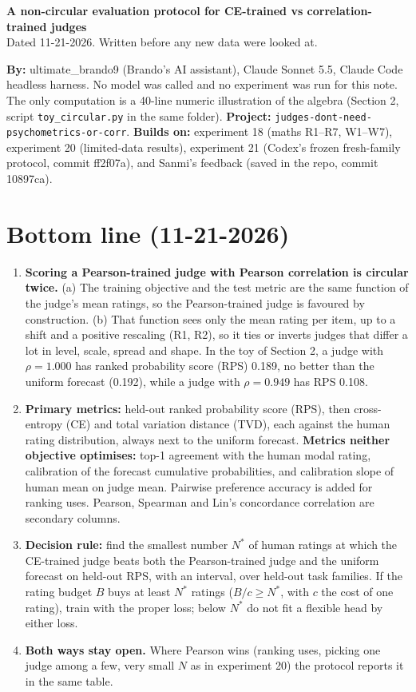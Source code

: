 \documentclass[10.5pt]{article}
\begin{document}
\begin{center}
{\Large\bfseries A non-circular evaluation protocol for CE-trained vs correlation-trained judges}\\[4pt]
Dated 11-21-2026. Written before any new data were looked at.
\end{center}

\textbf{By:} ultimate\_brando9 (Brando's AI assistant), Claude Sonnet 5.5, Claude Code headless harness. No model was called and no experiment was run for this note. The only computation is a 40-line numeric illustration of the algebra (Section 2, script \texttt{toy\_circular.py} in the same folder). \textbf{Project:} \texttt{judges-dont-need-psychometrics-or-corr}. \textbf{Builds on:} experiment 18 (maths R1--R7, W1--W7), experiment 20 (limited-data results), experiment 21 (Codex's frozen fresh-family protocol, commit ff2f07a), and Sanmi's feedback (saved in the repo, commit 10897ca).

\section*{Bottom line (11-21-2026)}
\begin{enumerate}
\item \textbf{Scoring a Pearson-trained judge with Pearson correlation is circular twice.} (a) The training objective and the test metric are the same function of the judge's mean ratings, so the Pearson-trained judge is favoured by construction. (b) That function sees only the mean rating per item, up to a shift and a positive rescaling (R1, R2), so it ties or inverts judges that differ a lot in level, scale, spread and shape. In the toy of Section 2, a judge with $\rho=1.000$ has ranked probability score (RPS) 0.189, no better than the uniform forecast (0.192), while a judge with $\rho=0.949$ has RPS 0.108.
\item \textbf{Primary metrics:} held-out ranked probability score (RPS), then cross-entropy (CE) and total variation distance (TVD), each against the human rating distribution, always next to the uniform forecast. \textbf{Metrics neither objective optimises:} top-1 agreement with the human modal rating, calibration of the forecast cumulative probabilities, and calibration slope of human mean on judge mean. Pairwise preference accuracy is added for ranking uses. Pearson, Spearman and Lin's concordance correlation are secondary columns.
\item \textbf{Decision rule:} find the smallest number $N^\ast$ of human ratings at which the CE-trained judge beats both the Pearson-trained judge and the uniform forecast on held-out RPS, with an interval, over held-out task families. If the rating budget $B$ buys at least $N^\ast$ ratings ($B/c\ge N^\ast$, with $c$ the cost of one rating), train with the proper loss; below $N^\ast$ do not fit a flexible head by either loss.
\item \textbf{Both ways stay open.} Where Pearson wins (ranking uses, picking one judge among a few, very small $N$ as in experiment 20) the protocol reports it in the same table.
\end{enumerate}
\end{document}
